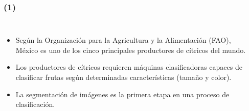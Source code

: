 \frame
{
\frametitle{ (1)}

\begin{columns}
\begin{itemize}
\item Según la Organización para la Agricultura y la Alimentación (FAO), México es uno de los cinco principales productores de cítricos del mundo. 
\item Los productores de cítricos requieren máquinas clasificadoras capaces de
clasificar frutas según determinadas características (tamaño y color). 
\item La segmentación de imágenes es la primera etapa en una proceso de clasificación. 
\end{itemize}
 \begin{center}
 \end{center}
\end{columns}



}

